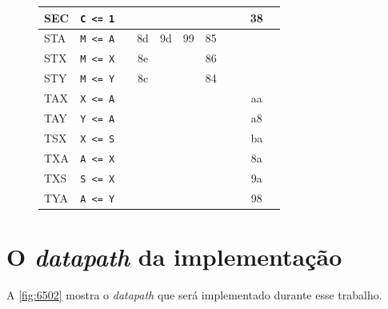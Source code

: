 \documentclass[
	12pt,				  %
	openright,		%
	a4paper,			%
	english,			%
	french,				%
	spanish,			%
	brazil,				%
]{abntex2}
\newcommand{\codenobg}[1]{\texttt{#1}}
\begin{document}
\begin{figure}
\begin{longtable}{|l|p{4cm}|c|c|c|c|c|c|c|c|c|}
		SEC                & \codenobg{C <= 1}             &             &               &               &              &             &                &            & 38            &              \\ \hline
		STA                & \codenobg{M <= A}             &             & 8d            & 9d            & 99           & 85          &                &            &               &              \\ \hline
		STX                & \codenobg{M <= X}             &             & 8e            &               &              & 86          &                &            &               &              \\ \hline
		STY                & \codenobg{M <= Y}             &             & 8c            &               &              & 84          &                &            &               &              \\ \hline
		TAX                & \codenobg{X <= A}             &             &               &               &              &             &                &            & aa            &              \\ \hline
		TAY                & \codenobg{Y <= A}             &             &               &               &              &             &                &            & a8            &              \\ \hline
		TSX                & \codenobg{X <= S}             &             &               &               &              &             &                &            & ba            &              \\ \hline
		TXA                & \codenobg{A <= X}             &             &               &               &              &             &                &            & 8a            &              \\ \hline
		TXS                & \codenobg{S <= X}             &             &               &               &              &             &                &            & 9a            &              \\ \hline
		TYA                & \codenobg{A <= Y}             &             &               &               &              &             &                &            & 98            &              \\ \hline
	\end{longtable}
\end{figure}

\section{O \emph{datapath} da implementação}
A \autoref{fig:6502} mostra o \emph{datapath} que será implementado durante esse
trabalho.
\end{document}
